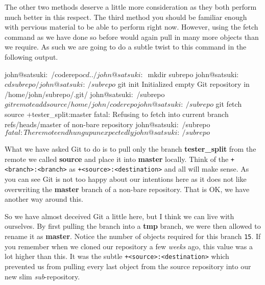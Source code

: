 {The other two methods deserve a little more consideration as they both perform much better in this respect.
The third method you should be familiar enough with pervious material to be able to perform right now.
However, using the fetch command as we have done so before would again pull in many more objects than we require.
As such we are going to do a subtle twist to this command in the following output.

\begin{code}
john@satsuki:~/coderepo$ cd ../
john@satsuki:~$ mkdir subrepo
john@satsuki:~$ cd subrepo/
john@satsuki:~/subrepo$ git init
Initialized empty Git repository in /home/john/subrepo/.git/
john@satsuki:~/subrepo$ git remote add source /home/john/coderepo
john@satsuki:~/subrepo$ git fetch source +tester_split:master
fatal: Refusing to fetch into current branch refs/heads/master of non-bare repository
john@satsuki:~/subrepo$ fatal: The remote end hung up unexpectedly
john@satsuki:~/subrepo$
\end{code}

What we have asked Git to do is to pull only the branch \textbf{tester\_split} from the remote we called \textbf{source} and place it into \textbf{master} locally.
Think of the \texttt{+<branch>:<branch>} as \texttt{+<source>:<destination>} and all will make sense.
As you can see Git is not too happy about our intentions here as it does not like overwriting the \textbf{master} branch of a non-bare repository.
That is OK, we have another way around this.


So we have almost deceived Git a little here, but I think we can live with ourselves.
By first pulling the branch into a \textbf{tmp} branch, we were then allowed to rename it as \textbf{master}.
Notice the number of objects required for this branch \texttt{15}.
If you remember when we cloned our repository a few \emph{weeks} ago, this value was a lot higher than this.
It was the subtle \texttt{+<source>:<destination>} which prevented us from pulling every last object from the source repository into our new slim \emph{sub}-repository.

}
